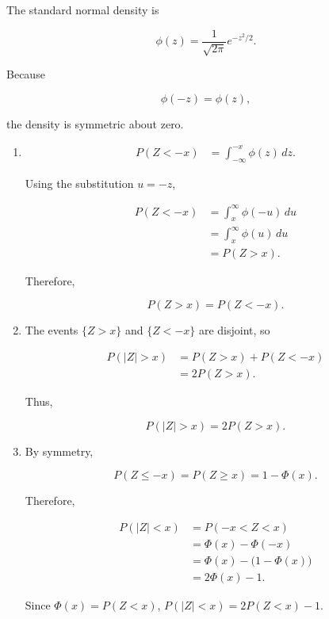 \documentclass[11pt]{article}
\newenvironment{solution}{
    \par
    \begin{tcolorbox}[
        colback=white,
        colframe=uwgold,
        boxrule=0.7pt,
        arc=2mm,
        left=3mm,
        right=3mm,
        top=2mm,
        bottom=2mm,
        breakable,
        before skip=0.5em,
        after skip=1em,
        title=\textbf{Solution},
        coltitle=uwpurple,
        fonttitle=\bfseries
    ]
}{
    \end{tcolorbox}
}
\begin{document}
\begin{solution}

The standard normal density is

\[
\phi(z)
=
\frac{1}{\sqrt{2\pi}}e^{-z^2/2}.
\]

Because

\[
\phi(-z)=\phi(z),
\]

the density is symmetric about zero.

\begin{enumerate}[label=(\alph*)]

\item

\begin{align*}
P(Z<-x)
&=
\int_{-\infty}^{-x}\phi(z)\,dz.
\end{align*}

Using the substitution \(u=-z\),

\begin{align*}
P(Z<-x)
&=
\int_x^\infty \phi(-u)\,du\\
&=
\int_x^\infty \phi(u)\,du\\
&=
P(Z>x).
\end{align*}

Therefore,

\[
 {P(Z>x)=P(Z<-x)}.
\]

\item The events \(\{Z>x\}\) and \(\{Z<-x\}\) are disjoint, so

\begin{align*}
P(|Z|>x)
&=
P(Z>x)+P(Z<-x)\\
&=
2P(Z>x).
\end{align*}

Thus,

\[
 {P(|Z|>x)=2P(Z>x)}.
\]

\item By symmetry,

\[
P(Z\leq -x)=P(Z\geq x)=1-\Phi(x).
\]

Therefore,

\begin{align*}
P(|Z|<x)
&=
P(-x<Z<x)\\
&=
\Phi(x)-\Phi(-x)\\
&=
\Phi(x)-\bigl(1-\Phi(x)\bigr)\\
&=
2\Phi(x)-1.
\end{align*}

Since \(\Phi(x)=P(Z<x)\), $P(|Z|<x)=2P(Z<x)-1.$



\end{enumerate}

\end{solution}
\end{document}
